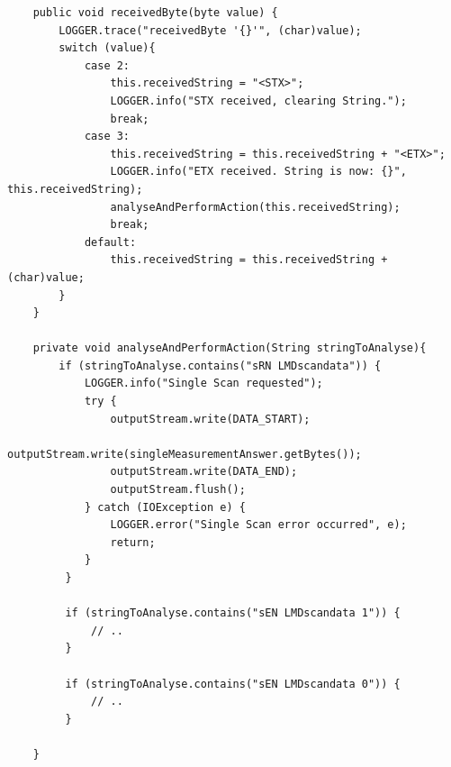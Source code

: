 \begin{lstlisting}
    public void receivedByte(byte value) {
        LOGGER.trace("receivedByte '{}'", (char)value);
        switch (value){
            case 2:
                this.receivedString = "<STX>";
                LOGGER.info("STX received, clearing String.");
                break;
            case 3:
                this.receivedString = this.receivedString + "<ETX>";
                LOGGER.info("ETX received. String is now: {}", this.receivedString);
                analyseAndPerformAction(this.receivedString);
                break;
            default:
                this.receivedString = this.receivedString + (char)value;
        }
    }

    private void analyseAndPerformAction(String stringToAnalyse){
        if (stringToAnalyse.contains("sRN LMDscandata")) {
            LOGGER.info("Single Scan requested");
            try {
                outputStream.write(DATA_START);
                outputStream.write(singleMeasurementAnswer.getBytes());
                outputStream.write(DATA_END);
                outputStream.flush();
            } catch (IOException e) {
                LOGGER.error("Single Scan error occurred", e);
                return;
            }
         }

         if (stringToAnalyse.contains("sEN LMDscandata 1")) {
             // ..
         }

         if (stringToAnalyse.contains("sEN LMDscandata 0")) {
             // ..
         }

    }
\end{lstlisting}